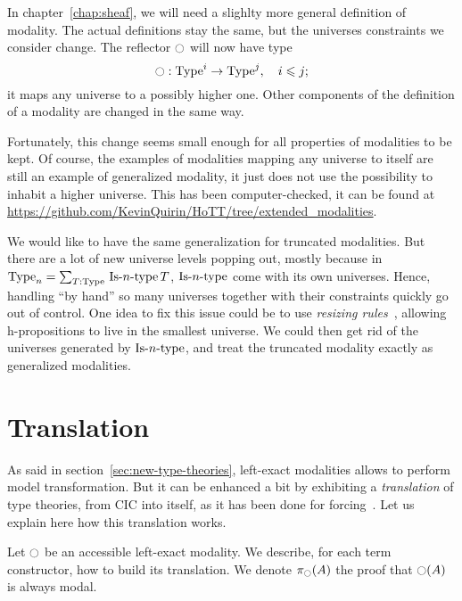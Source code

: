 In chapter~\ref{chap:sheaf}, we will need a slighlty more general
definition of modality. The actual definitions stay the same, but the
universes constraints we consider change. The reflector $\ocircle$ will
now have type
\[ \ocircle : \operatorname{Type}^i \to \operatorname{Type}^j,\quad i \leqslant j ;\]
it maps any universe to a possibly higher one.
Other components of the definition of a modality are changed in the
same way. 

Fortunately, this change seems small enough for all properties of
modalities to be kept. Of course, the examples of modalities mapping
any universe to itself are still an example of generalized modality,
it just does not use the possibility to inhabit a higher
universe. This has been computer-checked, it can be found at 
\url{https://github.com/KevinQuirin/HoTT/tree/extended_modalities}.

We would like to have the same generalization for truncated
modalities. But there are a lot of new universe levels popping out,
mostly because in $\operatorname{Type}_n = \sum_{T:\operatorname{Type}}\, \mathop{\mathrm{Is{\hbox{-}}}n\mathrm{{\hbox{-}} type}} T$, $\mathop{\mathrm{Is{\hbox{-}}}n\mathrm{{\hbox{-}} type}}$
come with its own universes. Hence, handling ``by hand'' so many
universes together with their constraints quickly go out of
control. One idea to fix this issue could be to use {\em resizing
  rules}~\cite{vv-resizing}, allowing h-propositions to live in the
smallest universe. We could then get rid of the universes generated by
$\mathop{\mathrm{Is{\hbox{-}}}n\mathrm{{\hbox{-}} type}}$, and treat the truncated modality exactly as generalized
modalities.







\section{Translation}
\label{sec:translation}

As said in section~\ref{sec:new-type-theories}, left-exact modalities
allows to perform model transformation. But it can be enhanced a bit
by exhibiting a {\em translation} of type theories, from CIC into
itself, as it has been done for
forcing~\cite{jaber2012extending,forcing2016}. Let us explain here how
this translation works.

Let $\ocircle$ be an accessible left-exact modality. We describe, for each term
constructor, how to build its translation. We denote $\pi_{\ocircle}(A)$
the proof that $\ocircle(A)$ is always modal.

